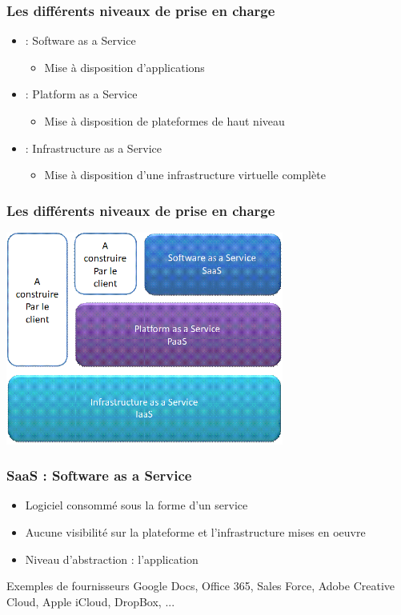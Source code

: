 \begin{frame}
  \frametitle{Les différents niveaux de prise en charge}
  \begin{itemize}
  \item <1>[SaaS] : Software as a Service
  \begin{itemize}
  \item Mise à disposition d'applications
  \end{itemize}
  \item <2>[PaaS] : Platform as a Service
  \begin{itemize}
  \item Mise à disposition de plateformes de haut niveau
  \end{itemize}
  \item <3>[IaaS] : Infrastructure as a Service
  \begin{itemize}
  \item Mise à disposition d'une infrastructure virtuelle complète
  \end{itemize}
  \end{itemize}
\end{frame}

\begin{frame}
  \frametitle{Les différents niveaux de prise en charge \cite{intro-cloud}}
  \includegraphics[height=7cm]{../illustration/niveaux-cloud.png}       
\end{frame}

\begin{frame}
\frametitle{SaaS : Software as a Service \cite{wp-saas}}
\begin{itemize}
\item Logiciel consommé sous la forme d’un service
\item Aucune visibilité sur la plateforme et l'infrastructure mises en oeuvre
\item Niveau d'abstraction : l'application
\end{itemize}
\begin{exampleblock}{Exemples de fournisseurs}
Google Docs, Office 365, Sales Force, Adobe Creative Cloud, Apple iCloud, DropBox, ... 
\end{exampleblock}
\end{frame}

